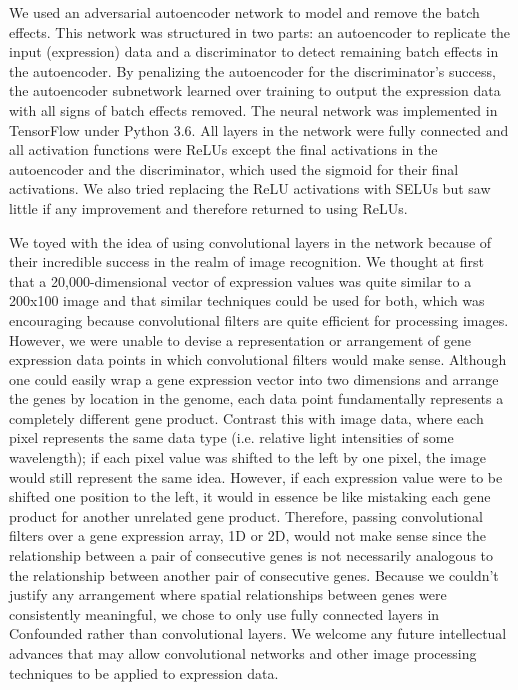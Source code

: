 \documentclass[notitlepage]{article}
\begin{document}
We used an adversarial autoencoder network to model and remove the batch effects.
This network was structured in two parts: an autoencoder to replicate the input (expression) data and a discriminator to detect remaining batch effects in the autoencoder.
By penalizing the autoencoder for the discriminator's success, the autoencoder subnetwork learned over training to output the expression data with all signs of batch effects removed.
The neural network was implemented in TensorFlow under Python 3.6.
All layers in the network were fully connected and all activation functions were ReLUs \cite{agarap_deep_2018} except the final activations in the autoencoder and the discriminator, which used the sigmoid for their final activations.
We also tried replacing the ReLU activations with SELUs \cite{klambauer_self-normalizing_2017} but saw little if any improvement and therefore returned to using ReLUs.

We toyed with the idea of using convolutional layers \cite{krizhevsky_imagenet_2012-1} in the network because of their incredible success in the realm of image recognition.
We thought at first that a 20,000-dimensional vector of expression values was quite similar to a 200x100 image and that similar techniques could be used for both, which was encouraging because convolutional filters are quite efficient for processing images.
However, we were unable to devise a representation or arrangement of gene expression data points in which convolutional filters would make sense.
Although one could easily wrap a gene expression vector into two dimensions and arrange the genes by location in the genome, each data point fundamentally represents a completely different gene product.
Contrast this with image data, where each pixel represents the same data type (i.e. relative light intensities of some wavelength); if each pixel value was shifted to the left by one pixel, the image would still represent the same idea.
However, if each expression value were to be shifted one position to the left, it would in essence be like mistaking each gene product for another unrelated gene product.
Therefore, passing convolutional filters over a gene expression array, 1D or 2D, would not make sense since the relationship between a pair of consecutive genes is not necessarily analogous to the relationship between another pair of consecutive genes.
Because we couldn't justify any arrangement where spatial relationships between genes were consistently meaningful, we chose to only use fully connected layers in Confounded rather than convolutional layers.
We welcome any future intellectual advances that may allow convolutional networks and other image processing techniques to be applied to expression data.
\end{document}
